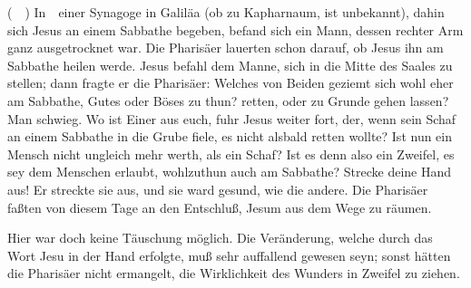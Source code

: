 \begin{aufza}\setcounter{enumi}{6}
\item {} (\ \ ) In~\ einer Synagoge in Galiläa (ob zu Kapharnaum, ist unbekannt), dahin sich Jesus an einem Sabbathe begeben, befand sich ein Mann, dessen rechter Arm ganz ausgetrocknet war. Die Pharisäer lauerten schon darauf, ob Jesus ihn am Sabbathe heilen werde. Jesus befahl dem Manne, sich in die Mitte des Saales zu stellen; dann fragte er die Pharisäer: Welches von Beiden geziemt sich wohl eher am Sabbathe, Gutes oder Böses zu thun? retten, oder zu Grunde gehen lassen? Man schwieg. Wo ist Einer aus euch, fuhr Jesus weiter fort, der, wenn sein Schaf an einem Sabbathe in die Grube fiele, es nicht alsbald retten wollte? Ist nun ein Mensch nicht ungleich mehr werth, als ein Schaf? Ist es denn also ein Zweifel, es sey dem Menschen erlaubt, wohlzuthun auch am Sabbathe? Strecke deine Hand aus! Er streckte sie aus, und sie ward gesund, wie die andere. Die Pharisäer faßten von diesem Tage an den Entschluß, Jesum aus dem Wege zu räumen.\par
Hier war doch keine Täuschung möglich. Die Veränderung, welche durch das Wort Jesu in der Hand erfolgte, muß sehr auffallend gewesen seyn; sonst hätten die Pharisäer nicht ermangelt, die Wirklichkeit des Wunders in Zweifel zu ziehen.

\end{aufza}
